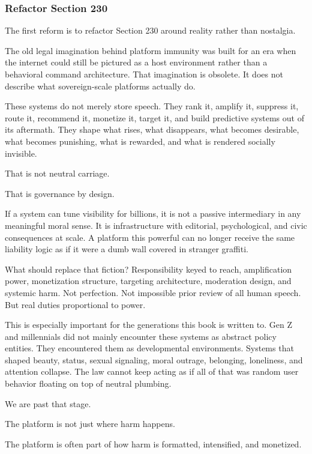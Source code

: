 \documentclass[
  american,
  12pt,
  letterpaper,
]{article}
\begin{document}
\subsubsection{Refactor Section 230}\label{refactor-section-230}

The first reform is to refactor Section 230 around reality rather than
nostalgia.

The old legal imagination behind platform immunity was built for an era
when the internet could still be pictured as a host environment rather
than a behavioral command architecture. That imagination is obsolete. It
does not describe what sovereign-scale platforms actually do.

These systems do not merely store speech. They rank it, amplify it,
suppress it, route it, recommend it, monetize it, target it, and build
predictive systems out of its aftermath. They shape what rises, what
disappears, what becomes desirable, what becomes punishing, what is
rewarded, and what is rendered socially invisible.

That is not neutral carriage.

That is governance by design.

If a system can tune visibility for billions, it is not a passive
intermediary in any meaningful moral sense. It is infrastructure with
editorial, psychological, and civic consequences at scale. A platform
this powerful can no longer receive the same liability logic as if it
were a dumb wall covered in stranger graffiti.

What should replace that fiction? Responsibility keyed to reach,
amplification power, monetization structure, targeting architecture,
moderation design, and systemic harm. Not perfection. Not impossible
prior review of all human speech. But real duties proportional to power.

This is especially important for the generations this book is written
to. Gen Z and millennials did not mainly encounter these systems as
abstract policy entities. They encountered them as developmental
environments. Systems that shaped beauty, status, sexual signaling,
moral outrage, belonging, loneliness, and attention collapse. The law
cannot keep acting as if all of that was random user behavior floating
on top of neutral plumbing.

We are past that stage.

The platform is not just where harm happens.

The platform is often part of how harm is formatted, intensified, and
monetized.
\end{document}
